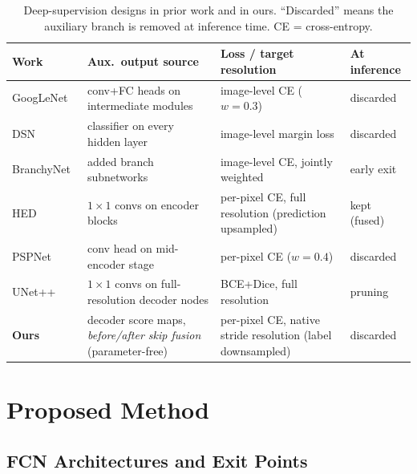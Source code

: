 \documentclass[runningheads]{llncs}
\begin{document}
    \begin{table}[h]
    \centering
    \caption{Deep-supervision designs in prior work and in ours. ``Discarded''
    means the auxiliary branch is removed at inference time. CE = cross-entropy.}
    \label{tab:related}
    \small
    \renewcommand{\arraystretch}{1.2}
    \begin{tabularx}{\textwidth}{@{}l Y Y l@{}}
    \toprule
    Work & Aux.\ output source & Loss / target resolution & At inference \\
    \midrule
    GoogLeNet~\cite{ref_googlenet} & conv{+}FC heads on intermediate modules & image-level CE ($w{=}0.3$) & discarded \\
    DSN~\cite{ref_dsn} & classifier on every hidden layer & image-level margin loss & discarded \\
    BranchyNet~\cite{ref_branchynet} & added branch subnetworks & image-level CE, jointly weighted & early exit \\
    HED~\cite{ref_hed} & $1{\times}1$ convs on encoder blocks & per-pixel CE, full resolution (prediction upsampled) & kept (fused) \\
    PSPNet~\cite{ref_pspnet} & conv head on mid-encoder stage & per-pixel CE ($w{=}0.4$) & discarded \\
    UNet++~\cite{ref_unetpp} & $1{\times}1$ convs on full-resolution decoder nodes & BCE{+}Dice, full resolution & pruning \\
    \midrule
    \textbf{Ours} & decoder score maps, \emph{before/after skip fusion} (parameter-free) & per-pixel CE, native stride resolution (label downsampled) & discarded \\
    \bottomrule
    \end{tabularx}
    \end{table}


\section{Proposed Method}

    \subsection{FCN Architectures and Exit Points}
    
\end{document}
